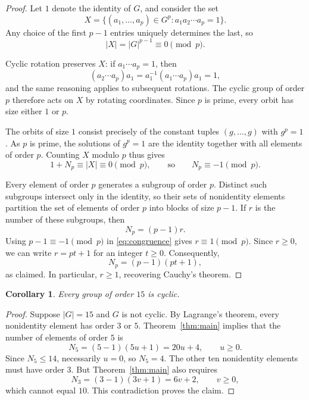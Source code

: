 \documentclass[11pt,letterpaper]{article}
\newtheorem{corollary}{Corollary}
\begin{document}
\begin{proof}
Let $1$ denote the identity of $G$, and consider the set
\begin{equation}\label{eq:tuples}
X=\bigl\{(a_1,\ldots,a_p)\in G^p : a_1a_2\cdots a_p=1\bigr\}.
\end{equation}
Any choice of the first $p-1$ entries uniquely determines the last, so
\begin{equation}\label{eq:size}
|X|=|G|^{p-1}\equiv 0\pmod p.
\end{equation}

Cyclic rotation preserves $X$: if $a_1\cdots a_p=1$, then
\[
(a_2\cdots a_p)a_1=a_1^{-1}(a_1\cdots a_p)a_1=1,
\]
and the same reasoning applies to subsequent rotations. The cyclic group of order $p$ therefore acts on $X$ by rotating coordinates. Since $p$ is prime, every orbit has size either $1$ or $p$.

The orbits of size $1$ consist precisely of the constant tuples $(g,\ldots,g)$ with $g^p=1$. As $p$ is prime, the solutions of $g^p=1$ are the identity together with all elements of order $p$. Counting $X$ modulo $p$ thus gives
\begin{equation}\label{eq:congruence}
1+N_p\equiv |X|\equiv0\pmod p,
\qquad\text{so}\qquad N_p\equiv-1\pmod p.
\end{equation}

Every element of order $p$ generates a subgroup of order $p$. Distinct such subgroups intersect only in the identity, so their sets of nonidentity elements partition the set of elements of order $p$ into blocks of size $p-1$. If $r$ is the number of these subgroups, then
\[
N_p=(p-1)r.
\]
Using $p-1\equiv-1\pmod p$ in \eqref{eq:congruence} gives $r\equiv1\pmod p$. Since $r\ge0$, we can write $r=pt+1$ for an integer $t\ge0$. Consequently,
\[
N_p=(p-1)(pt+1),
\]
as claimed. In particular, $r\ge1$, recovering Cauchy's theorem.
\end{proof}

\clearpage
{}\par\vspace{0.4em}
\begin{corollary}\label{cor:15}
Every group of order $15$ is cyclic.
\end{corollary}

\begin{proof}
Suppose $|G|=15$ and $G$ is not cyclic. By Lagrange's theorem, every nonidentity element has order $3$ or $5$. Theorem~\ref{thm:main} implies that the number of elements of order $5$ is
\[
N_5=(5-1)(5u+1)=20u+4,\qquad u\ge0.
\]
Since $N_5\le14$, necessarily $u=0$, so $N_5=4$. The other ten nonidentity elements must have order $3$. But Theorem~\ref{thm:main} also requires
\[
N_3=(3-1)(3v+1)=6v+2,\qquad v\ge0,
\]
which cannot equal $10$. This contradiction proves the claim.
\end{proof}
\end{document}
